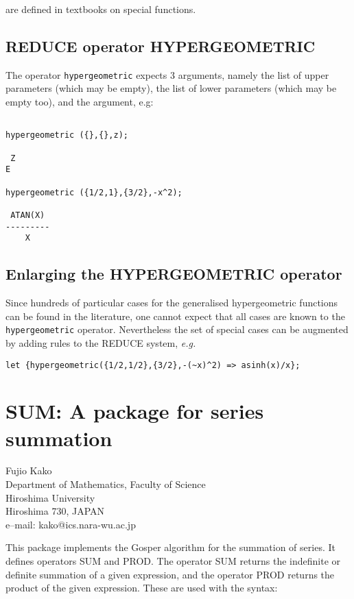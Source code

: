 \documentclass[11pt,letterpaper]{book}
\makeatletter
\newcommand{\REDUCE}{REDUCE}
\newcommand{\underscore}{\_}
\newcommand{\ttindex}[1]{{\renewcommand{\_}{\protect\underscore}%
                          \index{#1@{\tt #1}}}}
\makeatother
\begin{document}
are defined in textbooks on special functions.
\section{\REDUCE{} operator HYPERGEOMETRIC}

The operator {\tt hypergeometric} expects 3 arguments, namely the
list of upper parameters (which may be empty), the list of lower
parameters (which may be empty too), and the argument, e.g:

{\small\begin{verbatim}

hypergeometric ({},{},z);

 Z
E

hypergeometric ({1/2,1},{3/2},-x^2);

 ATAN(X)
---------
    X
\end{verbatim}}


\section{Enlarging the HYPERGEOMETRIC operator}

Since hundreds of particular cases for the generalised hypergeometric
functions can be found in the literature, one cannot expect that all
cases are known to the {\tt hypergeometric} operator.
Nevertheless the set of special cases can be augmented by adding
rules to the \REDUCE{} system, {\em e.g.}
{\small\begin{verbatim}
let {hypergeometric({1/2,1/2},{3/2},-(~x)^2) => asinh(x)/x};
\end{verbatim}}

\chapter{SUM: A package for series summation}
\label{SUM}

{\footnotesize
\begin{center}
Fujio Kako \\
Department of Mathematics, Faculty of Science \\
Hiroshima University \\
Hiroshima 730, JAPAN \\[0.05in]
e--mail: kako@ics.nara-wu.ac.jp
\end{center}
}
\ttindex{SUM}

This package implements the Gosper algorithm for the summation of series.
It defines operators SUM and PROD.  The operator SUM returns the indefinite
or definite summation of a given expression, and the operator PROD returns
the product of the given expression.  These are used with the syntax:
\end{document}

